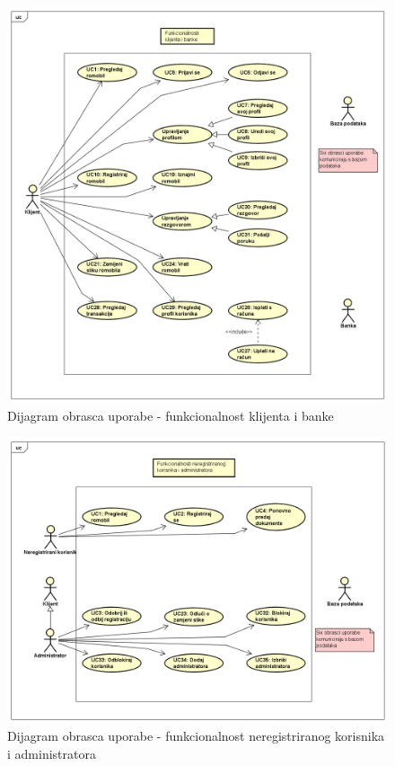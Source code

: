 					\begin{figure} [H]
						
						\includegraphics[width=1\linewidth]{dijagrami/klijent.png}
						\centering
						\caption{Dijagram obrasca uporabe - funkcionalnost klijenta i banke}
						\label{fig:Dijagram obrasca uporabe - funkcionalnost klijenta i banke}
					\end{figure}
					
					\begin{figure} [H]
						
						\includegraphics[width=1\linewidth]{dijagrami/admin_neregistrirani.png}
						\centering
						\caption{Dijagram obrasca uporabe - funkcionalnost neregistriranog korisnika i administratora}
						\label{fig:Dijagram obrasca uporabe - funkcionalnost neregistriranog korisnika i administratora}
					\end{figure}
					
